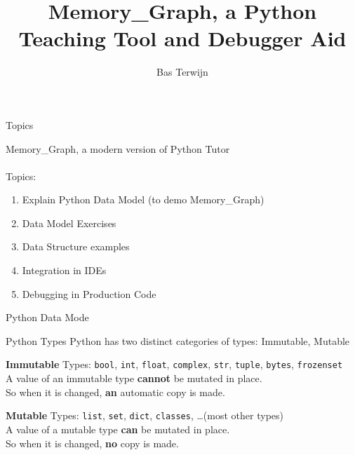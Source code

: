 \documentclass[10pt, colorlinks=true, urlcolor=blue]{beamer}
\title{Memory\_Graph, a Python Teaching Tool and Debugger Aid}
\author{Bas Terwijn}
\date{}
\begin{document}
\begin{frame}
    \titlepage
\end{frame}

\begin{frame}{Topics}

  Memory\_Graph, a modern version of Python Tutor \\
  \vspace{1em} \\
  Topics:
  \begin{enumerate}
    \item Explain Python Data Model (to demo Memory\_Graph)
    \item Data Model Exercises
    \item Data Structure examples
    \item Integration in IDEs
    \item Debugging in Production Code
  \end{enumerate}
\end{frame}

\begin{frame}{Python Data Mode}
  \begin{block}{Python Types}
    Python has two distinct categories of types: Immutable, Mutable
  \end{block}
  
  \vspace{2.4em}
  
  \textbf{Immutable} Types: \texttt{bool}, \texttt{int}, \texttt{float}, \texttt{complex}, \texttt{str}, \texttt{tuple}, \texttt{bytes}, \texttt{frozenset} \\
  
  \vspace{-0.8em}
  A value of an immutable type \textbf{cannot} be mutated in place. \\
  So when it is changed, \textbf{an} automatic copy is made. \\
  
  \vspace{2.0em}
  
  \textbf{Mutable} Types: \texttt{list}, \texttt{set}, \texttt{dict}, \texttt{classes}, \dots (most other types) \\
  
  \vspace{-0.8em}
  A value of a mutable type \textbf{can} be mutated in place. \\
  So when it is changed, \textbf{no} copy is made.
\end{frame}
\end{document}
